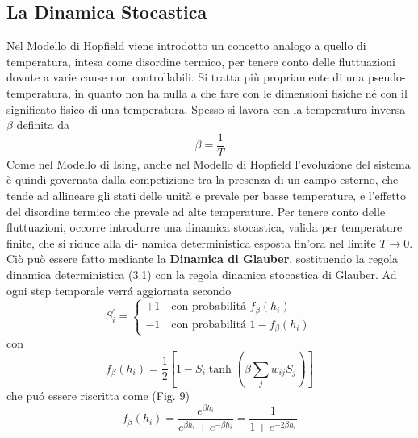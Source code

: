 \documentclass[12pt, a4paper]{book}
\theoremstyle{theorem}
\begin{document}
			\subsection{La Dinamica Stocastica}
				Nel Modello di Hopfield viene introdotto un concetto analogo a quello di temperatura, intesa come disordine termico, per tenere conto delle fluttuazioni dovute a varie cause non controllabili. Si tratta più propriamente di una pseudo-temperatura, in quanto non ha nulla a che fare con le dimensioni fisiche né con il significato fisico di una temperatura. Spesso si lavora con la temperatura inversa $\beta$ definita da
				\begin{equation}
					\beta = \frac{1}{T}
				\end{equation}
				Come nel Modello di Ising, anche nel Modello di Hopfield l’evoluzione del sistema è quindi governata dalla competizione tra la presenza di un campo esterno, che tende ad allineare gli stati delle unità e prevale per basse temperature, e l’effetto del disordine termico che prevale ad alte temperature. Per tenere conto delle fluttuazioni, occorre introdurre una dinamica stocastica, valida per temperature finite, che si riduce alla di- namica deterministica esposta fin’ora nel limite $T \rightarrow 0$. Ciò può essere fatto mediante la {\bf Dinamica di Glauber}, sostituendo la regola dinamica deterministica (3.1) con la regola dinamica stocastica di Glauber. Ad ogni step temporale verr\'a aggiornata secondo
				\begin{equation}
					S_i^\prime = 
					\begin{cases}
						+ 1 \quad \text{con probabilit\'a } f_\beta(h_i) \\
						-1 \quad \text{con probabilit\'a } 1 - f_\beta(h_i)
					\end{cases}
				\end{equation}
				con
				\begin{equation}
					f_\beta(h_i) = \frac{1}{2}\left[ 1 - S_i \tanh\left( \beta \sum_j w_{ij} S_j\right) \right]
				\end{equation}
				che pu\'o essere riscritta come (Fig. 9)
				\begin{equation}
					f_\beta(h_i) = \frac{e^{\beta h_i}}{e^{\beta h_i}+e^{-\beta h_i}} = \frac{1}{1+e^{-2\beta h_i}}
				\end{equation}
\end{document}
